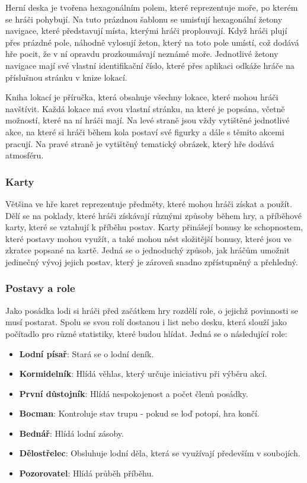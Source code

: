 Herní deska je tvořena hexagonálním polem, které reprezentuje moře, po kterém se hráči pohybují. Na tuto prázdnou šablonu se umisťují hexagonální žetony navigace, které představují místa, kterými hráči proplouvají. Když hráči plují přes prázdné pole, náhodně vylosují žeton, který na toto pole umístí, což dodává hře pocit, že v ní opravdu prozkoumávají neznámé moře. Jednotlivé žetony navigace mají své vlastní identifikační číslo, které přes aplikaci odkáže hráče na příslušnou stránku v knize lokací.

Kniha lokací je příručka, která obsahuje všechny lokace, které mohou hráči navštívit. Každá lokace má svou vlastní stránku, na které je popsána, včetně možností, které na ní hráči mají. Na levé straně jsou vždy vytištěné jednotlivé akce, na které si hráči během kola postaví své figurky a dále s těmito akcemi pracují. Na pravé straně je vytištěný tematický obrázek, který hře dodává atmosféru.

\subsubsection*{Karty}
\label{subsubsec:fw_comp_cards}

Většina ve hře karet reprezentuje předměty, které mohou hráči získat a použít. Dělí se na poklady, které hráči získávají různými způsoby během hry, a příběhové karty, které se vztahují k příběhu postav. Karty přinášejí bonusy ke schopnostem, které postavy mohou využít, a také mohou nést složitější bonusy, které jsou ve zkratce popsané na kartě. Jedná se o jednoduchý způsob, jak hráčům umožnit jedinečný vývoj jejich postav, který je zároveň snadno zpřístupněný a přehledný.

\subsubsection*{Postavy a role}
\label{subsubsec:fw_comp_roles}

Jako posádka lodi si hráči před začátkem hry rozdělí role, o jejichž povinnosti se musí postarat. Spolu se svou rolí dostanou i list nebo desku, která slouží jako počítadlo pro různé statistiky, které budou hlídat. Jedná se o následující role:

\begin{itemize}
    \item \textbf{Lodní písař}: Stará se o lodní deník.
    \item \textbf{Kormidelník}: Hlídá věhlas, který určuje iniciativu při výběru akcí.
    \item \textbf{První důstojník}: Hlídá nespokojenost a počet členů posádky.
    \item \textbf{Bocman}: Kontroluje stav trupu - pokud se loď potopí, hra končí.
    \item \textbf{Bednář}: Hlídá lodní zásoby.
    \item \textbf{Dělostřelec}: Obsluhuje lodní děla, která se využívají především v soubojích.
    \item \textbf{Pozorovatel}: Hlídá průběh příběhu.
\end{itemize}

